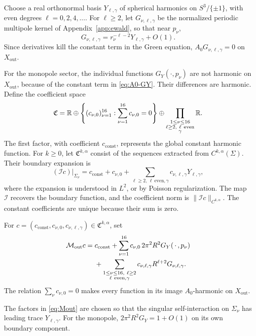 \documentclass[11pt,a4paper,twoside]{article}
\numberwithin{equation}{section}
\theoremstyle{definition}
\theoremstyle{remark}
\begin{document}
Choose a real orthonormal basis \(Y_{\ell,\gamma}\) of spherical
harmonics on \(S^3/\{\pm1\}\), with even degrees
\(\ell=0,2,4,\ldots\). For \(\ell\ge2\), let
\(G_{\nu,\ell,\gamma}\) be the normalized periodic multipole kernel
of Appendix~\ref{app:ewald}, so that near \(p_\nu\),
\[
G_{\nu,\ell,\gamma}
=
r_\nu^{-\ell-2}
Y_{\ell,\gamma}
+
O(1).
\]
Since derivatives kill the constant term in the Green equation, \(A_0G_{\nu,\ell,\gamma}=0\) on \(X_{\mathrm{out}}\).

For the monopole sector, the individual functions \(G_Y(\cdot,p_\nu)\)
are not harmonic on \(X_{\mathrm{out}}\), because of the constant
term in \eqref{eq:A0-GY}.  Their differences are harmonic.  Define
the coefficient space
\[
\mathfrak C
=
\mathbb R
\oplus
\left\{
(c_{\nu,0})_{\nu=1}^{16}:
\sum_{\nu=1}^{16}c_{\nu,0}=0
\right\}
\oplus
\prod_{\substack{
1\le\nu\le16\\
\ell\ge2,\ \ell\ {\rm even}\\
\gamma
}}
\mathbb R.
\]
The first factor, with coefficient \(c_{\mathrm{const}}\),
represents the global constant harmonic function.
For \(k\ge0\), let \(\mathfrak C^{k,\alpha}\) consist of the
sequences extracted from \(C^{k,\alpha}(\Sigma)\). Their boundary expansion is
\[
(\mathcal I c)|_{\Sigma_\nu}
=c_{\mathrm{const}}+c_{\nu,0}+\sum_{\ell\ge2,\,\ell\ \mathrm{even},\gamma}
c_{\nu,\ell,\gamma}Y_{\ell,\gamma},
\]
where the expansion is understood in \(L^2\), or by Poisson
regularization. The map \(\mathcal I\) recovers the boundary function,
and the coefficient norm is \(\|\mathcal I c\|_{C^{k,\alpha}}\).
The constant coefficients are unique because their sum is zero.

For \(c=\left(c_{\mathrm{const}},c_{\nu,0},c_{\nu,\ell,\gamma}\right)
\in\mathfrak C^{k,\alpha}\), set
\begin{equation}\label{eq:Mout}
\begin{aligned}
\mathcal M_{\mathrm{out}}c
={}&
c_{\mathrm{const}}
+
\sum_{\nu=1}^{16}
c_{\nu,0}
\,2\pi^2R^2
G_Y(\,\cdot\,,p_\nu)\\
&+
\sum_{\substack{
1\le\nu\le16,\ \ell\ge2\\
\ell\ {\rm even},\gamma
}}
c_{\nu,\ell,\gamma}
R^{\ell+2}
G_{\nu,\ell,\gamma}.
\end{aligned}
\end{equation}
The relation \(\sum_\nu c_{\nu,0}=0\) makes every function in
its image \(A_0\)-harmonic on \(X_{\mathrm{out}}\).

The factors in \eqref{eq:Mout} are chosen so that the singular
self-interaction on \(\Sigma_\nu\) has leading trace \(Y_{\ell,\gamma}.\) For the monopole, \(2\pi^2R^2G_Y = 1+O(1)\) on its own boundary component.
\end{document}
